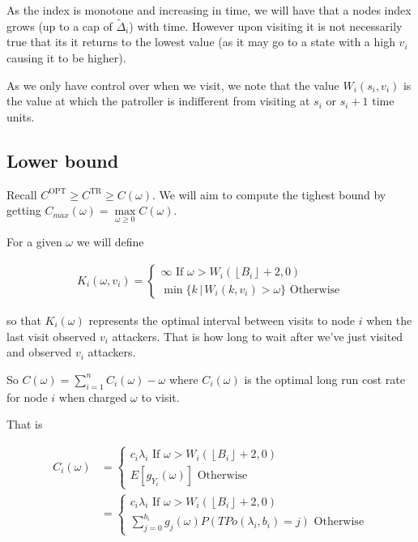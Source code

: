 \documentclass[a4paper,10pt]{article}
\newcommand{\floor}[1]{\left \lfloor #1 \right \rfloor}
\theoremstyle{definition}
\theoremstyle{definition}
\theoremstyle{remark}
\theoremstyle{definition}
\begin{document}
As the index is monotone and increasing in time, we will have that a nodes index grows (up to a cap of $\widetilde{\Delta}_{i}$) with time. However upon visiting it is not necessarily true that its it returns to the lowest value (as it may go to a state with a high $v_{i}$ causing it to be higher).

As we only have control over when we visit, we note that the value $W_{i}(s_{i},v_{i})$ is the value at which the patroller is indifferent from visiting at $s_{i}$ or $s_{i}+1$ time units.

\subsection{Lower bound}
Recall $C^{\text{OPT}} \geq C^{\text{TR}} \geq C(\omega)$. We will aim to compute the tighest bound by getting $C_{max}(\omega)=\max\limits_{\omega \geq 0}C(\omega)$.

For a given $\omega$ we will define

\begin{align}
K_{i}(\omega,v_{i})= \begin{cases}
\infty \text{ If } \omega > W_{i}(\floor{B_{i}}+2,0) \\
\min \{k \, | \, W_{i}(k,v_{i}) > \omega \} \text{ Otherwise}
\end{cases}
\end{align}

so that $K_{i}(\omega)$ represents the optimal interval between visits to node $i$ when the last visit observed $v_{i}$ attackers. That is how long to wait after we've just visited and observed $v_{i}$ attackers.

So $C(\omega)=\sum\limits_{i=1}^{n} C_{i}(\omega) -\omega$ where $C_{i}(\omega)$ is the optimal long run cost rate for node $i$ when charged $\omega$ to visit.

That is

\begin{align}
C_{i}(\omega)&=\begin{cases}
c_{i} \lambda_{i} \text{ If } \omega > W_{i}(\floor{B_{i}}+2,0) \\
E[g_{Y_{i}}(\omega)] \text{ Otherwise}
\end{cases} \\
&=\begin{cases}
c_{i} \lambda_{i} \text{ If } \omega > W_{i}(\floor{B_{i}}+2,0) \\
\sum\limits_{j=0}^{b_{i}}g_{j}(\omega)P(TPo(\lambda_{i},b_{i})=j) \text{ Otherwise}
\end{cases}
\end{align}
\end{document}
